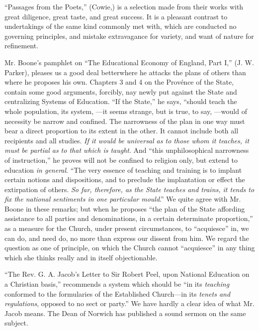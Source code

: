 ``Passages from the Poets,'' (Cowie,) is a selection
made from their works with great diligence, great taste, and great
success. It is a pleasant contrast to undertakings of the same kind
commonly met with, which are conducted no governing principles, and
mistake extravagance for variety, and want of nature for refinement.

Mr. Boone's pamphlet on ``The Educational Economy of
England, Part I,'' (J. W. Parker), pleases us a good deal betterwhere he
attacks the plans of others than where he proposes his own. Chapters 3
and 4 on the Provénce of the State, contain some good arguments,
forcibly, nay newly put against the State and centralizing Systems of
Education. ``If the State,'' he says, ``should teach the whole population,
its system, —it seems strange, but is true, to say, —would of
necessity be narrow and confined. The narrowness of the plan in one way
must bear a direct proportion to its extent in the other. It cannot
include both all recipients and all studies. \emph{If it would be universal
as to those whom it teaches, it must be partial as to that which is
taught}. And ``this unphilosophical narrowness of instruction,'' he
proves will not be confined to religion only, but extend to education \emph{in
general}. ``The very essence of teaching and training is to implant
certain notions and dispositions, and to preclude the implantation or
effect the extirpation of others. \emph{So far, therefore, as the State
teaches and trains, it tends to fix the national sentiments in one
particular mould}.'' We quite agree with Mr. Boone in these remarks;
but when he proposes ``the plan of the State affording assistance to all
parties and denominations, in a certain determinate proportion,'' as a
measure for the Church, under present circumstances, to ``acquiesce'' in,
we can do, and need do, no more than express our dissent from him. We
regard the question as one of principle, on which the Church cannot ``acquiesce''
in any thing which she thinks really and in itself objectionable.

``The Rev. G. A. Jacob's Letter to Sir Robert Peel,
upon National Education on a Christian basis,'' recommends a system which
should be ``in its \emph{teaching} conformed to the formularies of the
Established Church—in its \emph{tenets and regulations}, opposed to no
sect or party.'' We have hardly a clear idea of what Mr. Jacob means. The
Dean of Norwich has published a sound sermon on the same subject.

